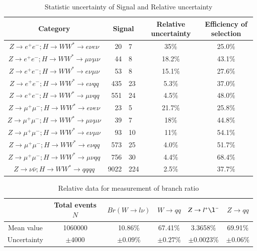 \documentclass[11pt,a4paper]{cepcnote}
\begin{document}
\begin{table}[H]
  \begin{center}
    \begin{tabular}{cr@{$\pm$}lcc}
      \hline \hline
      Category      &\multicolumn{2}{c}{Signal}& \multicolumn{1}{c}{Relative uncertainty} & \multicolumn{1}{c}{Efficiency of selection}\\ 
      \hline
      $Z\rightarrow e^+e^-; H\rightarrow WW^*\rightarrow e\nu e\nu			$	&20    &7	&35\%   &25.0\%\\
      $Z\rightarrow e^+e^-; H\rightarrow WW^*\rightarrow \mu\nu\mu\nu		$	&44    &8	&18.2\%	&43.1\%\\ 
      $Z\rightarrow e^+e^-; H\rightarrow WW^*\rightarrow e\nu\mu\nu			$	&53    &8	&15.1\% &27.6\%\\
	  $Z\rightarrow e^+e^-; H\rightarrow WW^*\rightarrow e\nu qq			$	&435   &23  &5.3\%  &37.0\%\\
	  $Z\rightarrow e^+e^-; H\rightarrow WW^*\rightarrow \mu\nu qq			$	&551   &24	&4.5\%  &48.0\%\\
      $Z\rightarrow \mu^+\mu^-; H\rightarrow WW^*\rightarrow e\nu e\nu		$	&23    &5	&21.7\% &25.8\%\\
      $Z\rightarrow \mu^+\mu^-; H\rightarrow WW^*\rightarrow \mu\nu\mu\nu	$	&39    &7	&18\%	&44.8\%\\ 
      $Z\rightarrow \mu^+\mu^-; H\rightarrow WW^*\rightarrow e\nu\mu\nu		$	&93    &10	&11\%   &54.1\%\\
	  $Z\rightarrow \mu^+\mu^-; H\rightarrow WW^*\rightarrow e\nu qq		$	&573   &25  &4.0\%  &51.7\%\\
	  $Z\rightarrow \mu^+\mu^-; H\rightarrow WW^*\rightarrow \mu\nu qq		$	&756   &30	&4.4\%  &68.4\%\\
	  $Z\rightarrow \nu\bar{\nu}; H\rightarrow WW^*\rightarrow qqqq			$	&9022  &224	&2.5\%  &37.7\%\\
      \hline \hline
    \end{tabular}
  \caption{Statistic uncertainty of Signal and Relative uncertainty}
  \label{tab:fullstatistic}
  \end{center}
\end{table}
\begin{table}[H]
\begin{center}
\begin{tabular}{cccccc}
\hline\hline
			&	Total events $N$ &	$Br(W\rightarrow l\nu)$  &  $W\rightarrow qq$  &  $Z\rightarrow l^+\l^-$  &  $Z\rightarrow qq$  \\
\hline
Mean value	&	1060000			 &  10.86\%					 &  67.41\%			   &  3.3658\%				  &  69.91\%			\\
Uncertainty	&	$\pm4000$		 &	$\pm0.09\%$				 &  $\pm0.27\%$		   &  $\pm0.0023\%$			  &  $\pm0.06\%$			\\
\hline\hline
\end{tabular}
\caption[]{Relative data for measurement of branch ratio}
\label{tab:relativeresult}
\end{center}
\end{table}
\end{document}
